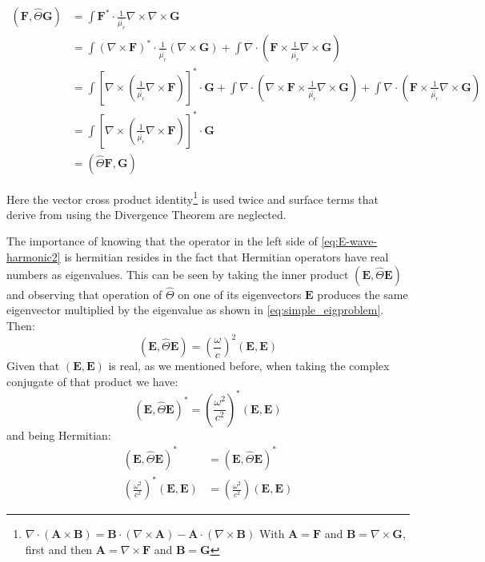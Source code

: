 \begin{align*}
\left(\mathbf{F},\hat{\Theta}\mathbf{G}\right) &=
\int \mathbf{F^*}\cdot \frac{1}{\bar{\bar{\mu_r}}}\nabla\times\nabla\times \mathbf{G}\\
& = \int \left(\nabla\times\mathbf{F}\right)^*\cdot
	\frac{1}{\bar{\bar{\mu_r}}}\left(\nabla\times\mathbf{G}
	\right)+ \int \nabla\cdot\left( \mathbf{F} \times \frac{1}{\bar{\bar{\mu_r}}}\nabla\times\mathbf{G} \right)\\
&= \int \left[\nabla\times \left(\frac{1}{\bar{\bar{\mu_r}}}\nabla\times\mathbf{F}\right)\right]^*
\cdot\mathbf{G} + 
\int \nabla\cdot\left(\nabla\times\mathbf{F} \times \frac{1}{\bar{\bar{\mu_r}}}\nabla\times\mathbf{G} \right)+\int \nabla\cdot\left( \mathbf{F} \times \frac{1}{\bar{\bar{\mu_r}}}\nabla\times\mathbf{G} \right) \\
& = \int \left[\nabla\times \left(\frac{1}{\bar{\bar{\mu_r}}}\nabla\times\mathbf{F}\right)\right]^*
\cdot\mathbf{G} \\
&= \left(\hat{\Theta}\mathbf{F},\mathbf{G}\right)
\end{align*}

Here the vector cross product identity\footnote{$\nabla \cdot \left(\mathbf{A}\times \mathbf{B} \right) = \mathbf{B}\cdot\left(\nabla \times \mathbf{A} \right) - \mathbf{A}\cdot\left(\nabla \times \mathbf{B} \right)$ With $\mathbf{A} = \mathbf{F}$ and $\mathbf{B} =\nabla\times\mathbf{G}$, first and then $\mathbf{A} = \nabla\times\mathbf{F}$ and $\mathbf{B} =\mathbf{G}$} is used twice and surface terms that derive from using the Divergence Theorem are neglected.

The importance of knowing that the operator in the left side of \ref{eq:E-wave-harmonic2} is hermitian resides in the fact that Hermitian operators have real numbers as eigenvalues.
This can be seen by taking the inner product $\left(\mathbf{E},\hat{\Theta}\mathbf{E}\right)$ and observing  that operation of $\hat{\Theta}$ on one of its eigenvectors $\mathbf{E}$ produces the same eigenvector multiplied by the eigenvalue as shown in \ref{eq:simple_eigproblem}. Then:
$$
\left(\mathbf{E},\hat{\Theta}\mathbf{E}\right) = \left(\frac{\omega}{c}\right)^2\left(\mathbf{E},\mathbf{E}\right)
$$
Given that $\left(\mathbf{E},\mathbf{E}\right)$ is real, as we mentioned before, when taking the complex conjugate 
of that product we have:
$$
\left(\mathbf{E},\hat{\Theta}\mathbf{E}\right)^* = \left(\frac{\omega^2}{c^2}\right)^*\left(\mathbf{E},\mathbf{E}\right)
$$
and being Hermitian: 
\begin{align*}
\left(\mathbf{E},\hat{\Theta}\mathbf{E}\right)^* &= \left(\mathbf{E},\hat{\Theta}\mathbf{E}\right)^* \\
\left(\frac{\omega^2}{c^2}\right)^*\left(\mathbf{E},\mathbf{E}\right) &= \left(\frac{\omega^2}{c^2}\right)\left(\mathbf{E},\mathbf{E}\right)
\end{align*}

